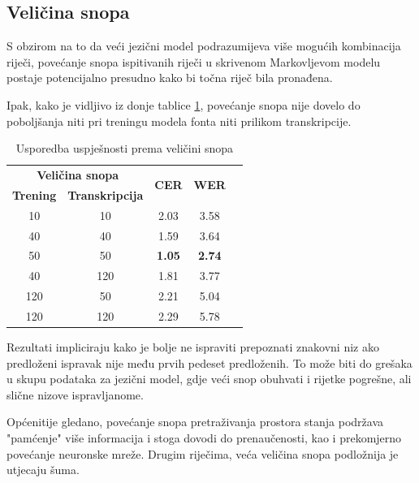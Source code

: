 \documentclass[zavrsnirad]{fer}
\begin{document}
\subsection{Veličina snopa}

S obzirom na to da veći jezični model podrazumijeva više mogućih kombinacija riječi, povećanje snopa ispitivanih riječi u skrivenom Markovljevom modelu postaje potencijalno presudno kako bi točna riječ bila pronađena.

Ipak, kako je vidljivo iz donje tablice \ref{tab:7.2}, povećanje snopa nije dovelo do poboljšanja niti pri treningu modela fonta niti prilikom transkripcije.

\bgroup
\def\arraystretch{1.25}
\begin{table}[h]
	\centering
	\begin{tabular}{|c|c|c|c|c|}
		\hline 
		\multicolumn{2}{|c|}{\textbf{Veličina snopa}} & \multicolumn{1}{|c|}{\multirow{2}{*}{\textbf{CER}}} & \multicolumn{1}{|c|}{\multirow{2}{*}{\textbf{WER}}} \\ \cline{1-2}
		
		\textbf{Trening}  & \textbf{Transkripcija}  & \multicolumn{1}{|c|}{}  & \multicolumn{1}{|c|}{}  \\ \hline
		10  & 10 &  2.03 & 3.58  \\ \hline
		40 & 40 &  1.59 & 3.64   \\ \hline
		50 & 50 &  \textbf{1.05} & \textbf{2.74}   \\ \hline
		40 & 120 & 1.81 & 3.77   \\ \hline
		120 & 50 & 2.21 & 5.04 \\ \hline        
		120 & 120 & 2.29 & 5.78 \\ \hline                                             
	\end{tabular}
	\caption{Usporedba uspješnosti prema veličini snopa}
	\label{tab:7.2}
\end{table}
\egroup

Rezultati impliciraju kako je bolje ne ispraviti prepoznati znakovni niz ako predloženi ispravak nije među prvih pedeset predloženih. To može biti do grešaka u skupu podataka za jezični model, gdje veći snop obuhvati i rijetke pogrešne, ali slične nizove ispravljanome. 

Općenitije gledano, povećanje snopa pretraživanja prostora stanja podržava "pamćenje" više informacija i stoga dovodi do prenaučenosti, kao i prekomjerno povećanje neuronske mreže. Drugim riječima, veća veličina snopa podložnija je utjecaju šuma. 
\end{document}
